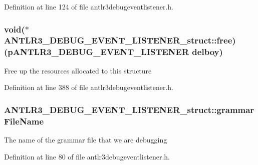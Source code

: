 Definition at line 124 of file antlr3debugeventlistener.\-h.

\hypertarget{struct_a_n_t_l_r3___d_e_b_u_g___e_v_e_n_t___l_i_s_t_e_n_e_r__struct_a72d80e00691f7ab256c5e5603cf8f24c}{
\subsubsection[{free}]{\setlength{\rightskip}{0pt plus 5cm}void($\ast$ A\-N\-T\-L\-R3\-\_\-\-D\-E\-B\-U\-G\-\_\-\-E\-V\-E\-N\-T\-\_\-\-L\-I\-S\-T\-E\-N\-E\-R\-\_\-struct\-::free)({\bf p\-A\-N\-T\-L\-R3\-\_\-\-D\-E\-B\-U\-G\-\_\-\-E\-V\-E\-N\-T\-\_\-\-L\-I\-S\-T\-E\-N\-E\-R} delboy)}}\label{struct_a_n_t_l_r3___d_e_b_u_g___e_v_e_n_t___l_i_s_t_e_n_e_r__struct_a72d80e00691f7ab256c5e5603cf8f24c}
Free up the resources allocated to this structure 

Definition at line 388 of file antlr3debugeventlistener.\-h.

\hypertarget{struct_a_n_t_l_r3___d_e_b_u_g___e_v_e_n_t___l_i_s_t_e_n_e_r__struct_a4f01c6add4000cd36d700e22754e55a8}{
\subsubsection[{grammar\-File\-Name}]{ A\-N\-T\-L\-R3\-\_\-\-D\-E\-B\-U\-G\-\_\-\-E\-V\-E\-N\-T\-\_\-\-L\-I\-S\-T\-E\-N\-E\-R\-\_\-struct\-::grammar\-File\-Name}}\label{struct_a_n_t_l_r3___d_e_b_u_g___e_v_e_n_t___l_i_s_t_e_n_e_r__struct_a4f01c6add4000cd36d700e22754e55a8}
The name of the grammar file that we are debugging 

Definition at line 80 of file antlr3debugeventlistener.\-h.

